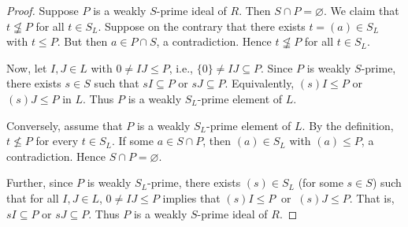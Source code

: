 \documentclass[10pt,a4paper]{amsart}
\begin{document}
\begin{proof}
	Suppose $P$ is a weakly $S$-prime ideal of $R$. Then $S\cap P=\varnothing$.  We claim that $t\not\leqq P$ for all $t\in S_L$. Suppose on the contrary that  there exists $t=(a)\in S_L$ with $t\le P$. But then $a\in P\cap S$, a contradiction.  
	Hence $t\not\leqq P$ for all $t\in S_L$.  
	
	Now, let $ I,J\in L$ with $0\neq IJ \leq P$, i.e., $\{0\}\neq IJ\subseteq P$. Since $P$ is weakly $S$-prime, there exists $s\in S$ such that $sI\subseteq P$ or $sJ\subseteq P$.  
	Equivalently, $(s)I\leq  P$ or $(s)J\leq P$ in $L$.  
	Thus $P$ is a weakly $S_L$-prime element of $L$.
	
	Conversely, assume that $P$ is a weakly $S_L$-prime element of $L$.  
	By the definition, $t\not\leq P$ for every $t\in S_L$. If some $a\in S\cap P$, then $(a)\in S_L$ with $(a)\le P$, a contradiction. Hence $S\cap P=\varnothing$.  
	
	Further, since $P$ is weakly $S_L$-prime, there exists $(s)\in S_L$ (for some $s\in S$) such that for all $I,J\in L$,
	$0\neq IJ\leq  P$ implies that $ (s)I\leq P \ \text{ or }\ (s)J\leq P$.
	That is, $sI\subseteq P$ or $sJ\subseteq P$. Thus $P$ is a weakly $S$-prime ideal of $R$.
\end{proof}
\end{document}
